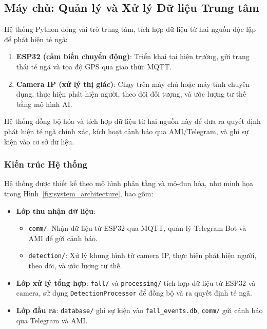 \subsection{Máy chủ: Quản lý và Xử lý Dữ liệu Trung tâm}
\label{sec:server_overview}

Hệ thống Python đóng vai trò trung tâm, tích hợp dữ liệu từ hai nguồn độc lập để phát hiện té ngã:
\begin{enumerate}
    \item \textbf{ESP32 (cảm biến chuyển động)}: Triển khai tại hiện trường, gửi trạng thái té ngã và tọa độ GPS qua giao thức MQTT.
    \item \textbf{Camera IP (xử lý thị giác)}: Chạy trên máy chủ hoặc máy tính chuyên dụng, thực hiện phát hiện người, theo dõi đối tượng, và ước lượng tư thế bằng mô hình AI.
\end{enumerate}

Hệ thống đồng bộ hóa và tích hợp dữ liệu từ hai nguồn này để đưa ra quyết định phát hiện té ngã chính xác, kích hoạt cảnh báo qua AMI/Telegram, và ghi sự kiện vào cơ sở dữ liệu.

\subsubsection{Kiến trúc Hệ thống}
\label{subsubsec:system_overview}

Hệ thống được thiết kế theo mô hình phân tầng và mô-đun hóa, như minh họa trong Hình~\ref{fig:system_architecture}, bao gồm:
\begin{itemize}
    \item \textbf{Lớp thu nhận dữ liệu}:
    \begin{itemize}
        \item \texttt{comm/}: Nhận dữ liệu từ ESP32 qua MQTT, quản lý Telegram Bot và AMI để gửi cảnh báo.
        \item \texttt{detection/}: Xử lý khung hình từ camera IP, thực hiện phát hiện người, theo dõi, và ước lượng tư thế.
    \end{itemize}
    \item \textbf{Lớp xử lý tổng hợp}: \texttt{fall/} và \texttt{processing/} tích hợp dữ liệu từ ESP32 và camera, sử dụng \texttt{DetectionProcessor} để đồng bộ và ra quyết định té ngã.
    \item \textbf{Lớp đầu ra}: \texttt{database/} ghi sự kiện vào \texttt{fall\_events.db}, \texttt{comm/} gửi cảnh báo qua Telegram và AMI.
\end{itemize}

